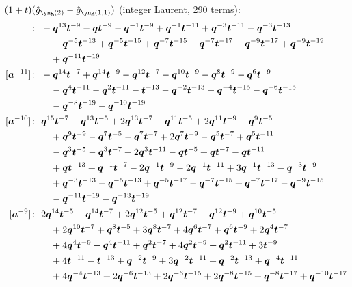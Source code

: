 $(1 + t)(\hat g_{\ytwo} - \hat g_{\yoneone})$ (integer Laurent, 290 terms):
\begin{align*}
[\ba^{-12}]\colon\ & -\bq^{13} \bt^{-9} -\bq \bt^{-9} -\bq^{-1} \bt^{-9} +\bq^{-1} \bt^{-11} +\bq^{-3} \bt^{-11} -\bq^{-3} \bt^{-13} \\
& \quad -\bq^{-5} \bt^{-13} +\bq^{-5} \bt^{-15} +\bq^{-7} \bt^{-15} -\bq^{-7} \bt^{-17} -\bq^{-9} \bt^{-17} +\bq^{-9} \bt^{-19} \\
& \quad +\bq^{-11} \bt^{-19} \\
[\ba^{-11}]\colon\ & -\bq^{14} \bt^{-7} +\bq^{14} \bt^{-9} -\bq^{12} \bt^{-7} -\bq^{10} \bt^{-9} -\bq^{8} \bt^{-9} -\bq^{6} \bt^{-9} \\
& \quad -\bq^{4} \bt^{-11} -\bq^{2} \bt^{-11} -\bt^{-13} -\bq^{-2} \bt^{-13} -\bq^{-4} \bt^{-15} -\bq^{-6} \bt^{-15} \\
& \quad -\bq^{-8} \bt^{-19} -\bq^{-10} \bt^{-19} \\
[\ba^{-10}]\colon\ & \bq^{15} \bt^{-7} -\bq^{13} \bt^{-5} +2 \bq^{13} \bt^{-7} -\bq^{11} \bt^{-5} +2 \bq^{11} \bt^{-9} -\bq^{9} \bt^{-5} \\
& \quad +\bq^{9} \bt^{-9} -\bq^{7} \bt^{-5} -\bq^{7} \bt^{-7} +2 \bq^{7} \bt^{-9} -\bq^{5} \bt^{-7} +\bq^{5} \bt^{-11} \\
& \quad -\bq^{3} \bt^{-5} -\bq^{3} \bt^{-7} +2 \bq^{3} \bt^{-11} -\bq \bt^{-5} +\bq \bt^{-7} -\bq \bt^{-11} \\
& \quad +\bq \bt^{-13} +\bq^{-1} \bt^{-7} -2 \bq^{-1} \bt^{-9} -2 \bq^{-1} \bt^{-11} +3 \bq^{-1} \bt^{-13} -\bq^{-3} \bt^{-9} \\
& \quad +\bq^{-3} \bt^{-13} -\bq^{-5} \bt^{-13} +\bq^{-5} \bt^{-17} -\bq^{-7} \bt^{-15} +\bq^{-7} \bt^{-17} -\bq^{-9} \bt^{-15} \\
& \quad -\bq^{-11} \bt^{-19} -\bq^{-13} \bt^{-19} \\
[\ba^{-9}]\colon\ & 2 \bq^{14} \bt^{-5} -\bq^{14} \bt^{-7} +2 \bq^{12} \bt^{-5} +\bq^{12} \bt^{-7} -\bq^{12} \bt^{-9} +\bq^{10} \bt^{-5} \\
& \quad +2 \bq^{10} \bt^{-7} +\bq^{8} \bt^{-5} +3 \bq^{8} \bt^{-7} +4 \bq^{6} \bt^{-7} +\bq^{6} \bt^{-9} +2 \bq^{4} \bt^{-7} \\
& \quad +4 \bq^{4} \bt^{-9} -\bq^{4} \bt^{-11} +\bq^{2} \bt^{-7} +4 \bq^{2} \bt^{-9} +\bq^{2} \bt^{-11} +3 \bt^{-9} \\
& \quad +4 \bt^{-11} -\bt^{-13} +\bq^{-2} \bt^{-9} +3 \bq^{-2} \bt^{-11} +\bq^{-2} \bt^{-13} +\bq^{-4} \bt^{-11} \\
& \quad +4 \bq^{-4} \bt^{-13} +2 \bq^{-6} \bt^{-13} +2 \bq^{-6} \bt^{-15} +2 \bq^{-8} \bt^{-15} +\bq^{-8} \bt^{-17} +\bq^{-10} \bt^{-17} \\

\end{align*}
